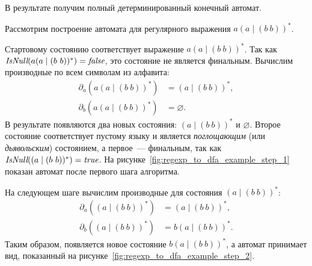 В результате получим полный детерминированный конечный автомат.

\begin{example}
    Рассмотрим построение автомата для регулярного выражения $a(a \mid (b \ b))^*$.

    Стартовому состоянию соответствует выражение $a(a \mid (b \ b))^*$.
    Так как $\emph{IsNull}(a(a \mid (b \ b))^*) = \emph{false}$, это состояние не является финальным.
    Вычислим производные по всем символам из алфавита:
    \begin{align*}
        \partial_a(a(a \mid (b \ b))^*) & = (a \mid (b \ b))^*, \\
        \partial_b(a(a \mid (b \ b))^*) & = \varnothing.
    \end{align*}
    В результате появляются два новых состояния: $(a \mid (b \ b))^*$ и $\varnothing$.
    Второе состояние соответствует пустому языку и является \emph{поглощающим} (или \emph{дьявольским}) состоянием, а первое~--- финальным, так как $\emph{IsNull}((a \mid (b \ b))^*) = \emph{true}$.
    На рисунке~\ref{fig:regexp_to_dfa_example_step_1} показан автомат после первого шага алгоритма.

    \begin{marginfigure}
        \begin{center}
        \end{center}
        \caption{Построение автомата по регулярному выражению с помощью производных: первый шаг}
        \label{fig:regexp_to_dfa_example_step_1}
    \end{marginfigure}

    На следующем шаге вычислим производные для состояния $(a \mid (b \ b))^*$:
    \begin{align*}
        \partial_a((a \mid (b \ b))^*) & = (a \mid (b \ b))^*, \\
        \partial_b((a \mid (b \ b))^*) & = b(a \mid (b \ b))^*.
    \end{align*}
    Таким образом, появляется новое состояние $b(a \mid (b \ b))^*$, а автомат принимает вид, показанный на рисунке~\ref{fig:regexp_to_dfa_example_step_2}.


\end{example}
